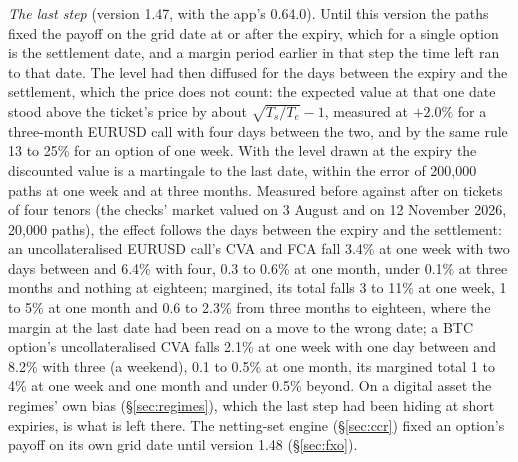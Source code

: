 \documentclass[11pt,a4paper]{article}
\begin{document}
\emph{The last step} (version 1.47, with the app's 0.64.0). Until this version the paths fixed the payoff on the grid date at or after the expiry, which for a single option is the settlement date, and a margin period earlier in that step the time left ran to that date. The level had then diffused for the days between the expiry and the settlement, which the price does not count: the expected value at that one date stood above the ticket's price by about $\sqrt{T_s/T_e}-1$, measured at $+2.0\%$ for a three-month EURUSD call with four days between the two, and by the same rule 13 to 25\% for an option of one week. With the level drawn at the expiry the discounted value is a martingale to the last date, within the error of 200,000 paths at one week and at three months. Measured before against after on tickets of four tenors (the checks' market valued on 3 August and on 12 November 2026, 20,000 paths), the effect follows the days between the expiry and the settlement: an uncollateralised EURUSD call's CVA and FCA fall 3.4\% at one week with two days between and 6.4\% with four, 0.3 to 0.6\% at one month, under 0.1\% at three months and nothing at eighteen; margined, its total falls 3 to 11\% at one week, 1 to 5\% at one month and 0.6 to 2.3\% from three months to eighteen, where the margin at the last date had been read on a move to the wrong date; a BTC option's uncollateralised CVA falls 2.1\% at one week with one day between and 8.2\% with three (a weekend), 0.1 to 0.5\% at one month, its margined total 1 to 4\% at one week and one month and under 0.5\% beyond. On a digital asset the regimes' own bias (\S\ref{sec:regimes}), which the last step had been hiding at short expiries, is what is left there. The netting-set engine (\S\ref{sec:ccr}) fixed an option's payoff on its own grid date until version 1.48 (\S\ref{sec:fxo}).
\end{document}

